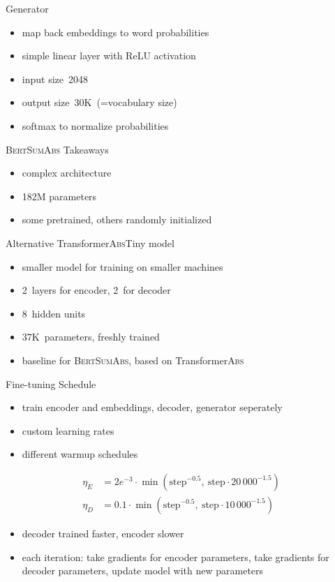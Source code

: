 \documentclass[english,handout]{mlutalk}
\newcommand{\BertSumAbs}{\textsc{BertSumAbs}\xspace}
\newcommand{\TransformerAbs}{Transformer\textsc{Abs}\xspace}
\newcommand{\TransformerAbsTiny}{Transformer\textsc{Abs}Tiny\xspace}
\begin{document}
\begin{frame}{Generator}
    \begin{itemize}
        \item map back embeddings to word probabilities
        \item simple linear layer with ReLU activation
        \item input size~2048
        \item output size~30K~(=vocabulary size)
        \item softmax to normalize probabilities
    \end{itemize}
\end{frame}

\begin{frame}{\BertSumAbs Takeaways}
    \begin{itemize}
        \item complex architecture
        \item 182M parameters
        \item some pretrained, others randomly initialized
    \end{itemize}
    \begin{block}{Alternative \TransformerAbsTiny model}
        \begin{itemize}
            \item smaller model for training on smaller machines
            \item 2~layers for encoder, 2~for decoder
            \item 8~hidden units
            \item 37K~parameters, freshly trained
            \item baseline for \BertSumAbs, based on \TransformerAbs~\cite{LiuL2019}
        \end{itemize}
    \end{block}
\end{frame}

\begin{frame}{Fine-tuning Schedule}
    \begin{itemize}
        \item train encoder and embeddings, decoder, generator seperately~\cite{LiuL2019}
        \item custom learning rates
        \item different warmup schedules
    \end{itemize}
    \begin{align*}
        \eta_E &= 2e^{-3} \cdot \min( \text{step}^{-0.5},\ \text{step} \cdot 20\,000^{-1.5} ) \\
        \eta_D &= 0.1 \cdot \min( \text{step}^{-0.5},\ \text{step} \cdot 10\,000^{-1.5} )
    \end{align*}
    \begin{itemize}
        \item decoder trained faster, encoder slower
        \item each iteration: take gradients for encoder parameters, take gradients for decoder parameters, update model with new parameters 
    \end{itemize}
\end{frame}
\end{document}
